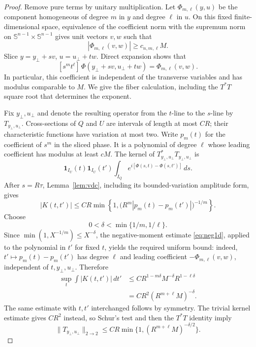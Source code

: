 \documentclass[11pt]{article}
\numberwithin{equation}{section}
\theoremstyle{remark}
\theoremstyle{definition}
\newcommand{\Sph}{\mathbb S}
\newcommand{\norm}[1]{\lVert #1\rVert}
\begin{document}
\begin{proof}
Remove pure terms by unitary multiplication.  Let
$\Phi_{m,\ell}(y,u)$ be the component homogeneous of degree $m$ in $y$
and degree $\ell$ in $u$.  On this fixed finite-dimensional space,
equivalence of the coefficient norm with the supremum norm on
$\Sph^{n-1}\times\Sph^{n-1}$ gives unit vectors $v,w$ such that
\[
 |\Phi_{m,\ell}(v,w)|\ge c_{n,m,\ell}M.
\]
Slice $y=y_\perp+sv$, $u=u_\perp+tw$.  Direct expansion shows that
\begin{equation}\label{eq:compact-leading-contraction}
 [s^mt^\ell]\,
 \Phi(y_\perp+sv,u_\perp+tw)=\Phi_{m,\ell}(v,w).
\end{equation}
In particular, this coefficient is independent of the transverse
variables and has modulus comparable to $M$.  We give the fiber
calculation, including the $T^*T$ square root that determines the exponent.

Fix $y_\perp,u_\perp$ and denote the resulting operator from the $t$-line
to the $s$-line by $T_{y_\perp,u_\perp}$.  Cross-sections of $Q$ and $U$
are intervals of length at most $CR$; their characteristic functions have
variation at most two.  Write $p_m(t)$ for the coefficient of $s^m$ in
the sliced phase.  It is a polynomial of degree $\ell$ whose leading
coefficient has modulus at least $cM$.  The kernel of
$T_{y_\perp,u_\perp}^*T_{y_\perp,u_\perp}$ is
\[
 \mathbf1_{I_U}(t)\mathbf1_{I_U}(t')
 \int_{I_Q}e^{i[\Phi(s,t)-\Phi(s,t')]}\,ds.
\]
After $s=R\tau$, Lemma~\ref{lem:vdc}, including its bounded-variation
amplitude form, gives
\begin{equation}\label{eq:compact-fiber-kernel}
 |K(t,t')|\le CR\min\left\{1,
  \bigl(R^m|p_m(t)-p_m(t')|\bigr)^{-1/m}\right\}.
\end{equation}
Choose
\[
 0<\delta<\min\{1/m,1/\ell\}.
\]
Since $\min(1,X^{-1/m})\le X^{-\delta}$, the negative-moment
estimate \eqref{eq:neg1d}, applied to the polynomial in $t'$ for fixed
$t$, yields the required uniform bound: indeed,
$t'\mapsto p_m(t)-p_m(t')$ has degree $\ell$ and leading coefficient
$-\Phi_{m,\ell}(v,w)$, independent of $t,y_\perp,u_\perp$.  Therefore
\begin{align*}
 \sup_t\int|K(t,t')|\,dt'
 &\le C R^{1-m\delta}M^{-\delta}R^{1-\ell\delta}\\
 &=CR^2(R^{m+\ell}M)^{-\delta}.
\end{align*}
The same estimate with $t,t'$ interchanged follows by symmetry.  The
trivial kernel estimate gives $CR^2$ instead, so Schur's test and then the
$T^*T$ identity imply
\begin{equation}\label{eq:compact-slice}
 \norm{T_{y_\perp,u_\perp}}_{2\to2}
 \le CR\min\{1,(R^{m+\ell}M)^{-\delta/2}\}.
\end{equation}


\end{proof}
\end{document}
